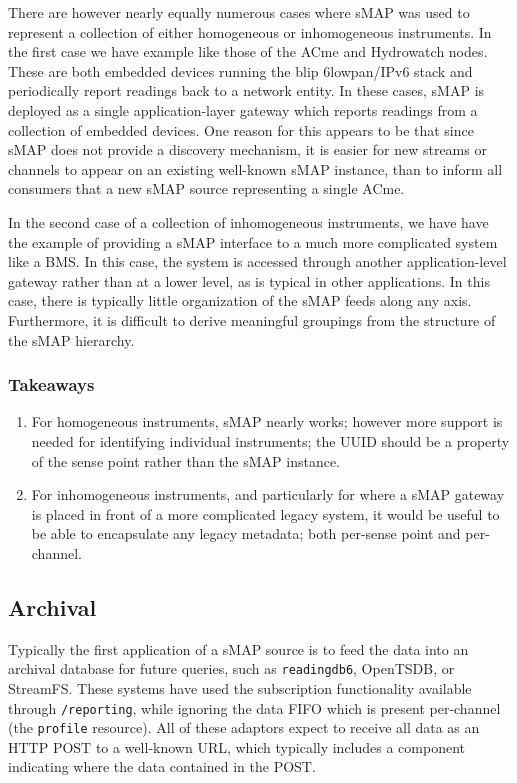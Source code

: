 \documentclass[10pt,letterpaper]{article}
\newcommand{\smap}{sMAP}
\begin{document}
There are however nearly equally numerous cases where sMAP was used to
represent a collection of either homogeneous or inhomogeneous instruments.  In
the first case we have example like those of the ACme and Hydrowatch nodes.
These are both embedded devices running the blip 6lowpan/IPv6 stack and
periodically report readings back to a network entity.  In these cases, sMAP
is deployed as a single application-layer gateway which reports readings from
a collection of embedded devices.  One reason for this appears to be that
since \smap{} does not provide a discovery mechanism, it is easier for new
streams or channels to appear on an existing well-known \smap{} instance, than to
inform all consumers that a new sMAP source representing a single ACme.

In the second case of a collection of inhomogeneous instruments, we have have
the example of providing a \smap{} interface to a much more complicated system
like a BMS.  In this case, the system is accessed through another
application-level gateway rather than at a lower level, as is typical in other
applications.  In this case, there is typically little organization of the
sMAP feeds along any axis.  Furthermore, it is difficult to derive meaningful
groupings from the structure of the sMAP hierarchy.

\subsubsection{Takeaways}

\begin{enumerate}
\item For homogeneous instruments, \smap{} nearly works; however more support is
needed for identifying individual instruments; the UUID should be a property
of the sense point rather than the \smap{} instance.

\item For inhomogeneous instruments, and particularly for where a \smap{} gateway is
placed in front of a more complicated legacy system, it would be useful to be
able to encapsulate any legacy metadata; both per-sense point and per-channel.
\end{enumerate}

\subsection{Archival}

Typically the first application of a \smap{} source is to feed the data into
an archival database for future queries, such as {\tt readingdb6}, OpenTSDB,
or StreamFS.  These systems have used the subscription functionality available
through {\tt /reporting}, while ignoring the data FIFO which is present
per-channel (the {\tt profile} resource).  All of these adaptors expect to
receive all data as an HTTP POST to a well-known URL, which typically includes
a component indicating where the data contained in the POST.
\end{document}
